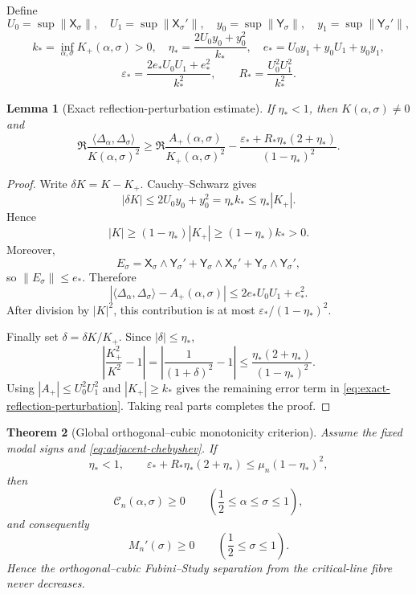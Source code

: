\documentclass[11pt]{amsart}
\numberwithin{equation}{section}
\newtheorem{theorem}{Theorem}[section]
\newtheorem{lemma}[theorem]{Lemma}
\begin{document}
Define
\[
U_0=\sup\|\mathsf X_\sigma\|,\quad
U_1=\sup\|\mathsf X_\sigma'\|,\quad
y_0=\sup\|\mathsf Y_\sigma\|,\quad
y_1=\sup\|\mathsf Y_\sigma'\|,
\]
\[
k_*=\inf_{\alpha,\sigma}K_+(\alpha,\sigma)>0,
\quad
\eta_*=\frac{2U_0y_0+y_0^2}{k_*},
\quad
e_*=U_0y_1+y_0U_1+y_0y_1,
\]
\[
\varepsilon_*=\frac{2e_*U_0U_1+e_*^2}{k_*^2},
\qquad
R_*=\frac{U_0^2U_1^2}{k_*^2}.
\]

\begin{lemma}[Exact reflection-perturbation estimate]
\label{lem:exact-reflection-perturbation}
If $\eta_*<1$, then $K(\alpha,\sigma)\ne0$ and
\begin{equation}
\Re\frac{\langle\Delta_\alpha,\Delta_\sigma\rangle}
{K(\alpha,\sigma)^2}
\ge
\Re\frac{A_+(\alpha,\sigma)}{K_+(\alpha,\sigma)^2}
-\frac{\varepsilon_*+R_*\eta_*(2+\eta_*)}{(1-\eta_*)^2}.
\label{eq:exact-reflection-perturbation}
\end{equation}
\end{lemma}

\begin{proof}
Write $\delta K=K-K_+$.  Cauchy--Schwarz gives
\[
|\delta K|
\le2U_0y_0+y_0^2
=\eta_*k_*
\le\eta_*|K_+|.
\]
Hence
\[
|K|\ge(1-\eta_*)|K_+|
\ge(1-\eta_*)k_*>0.
\]
Moreover,
\[
E_\sigma
=\mathsf X_\sigma\wedge\mathsf Y_\sigma'
+\mathsf Y_\sigma\wedge\mathsf X_\sigma'
+\mathsf Y_\sigma\wedge\mathsf Y_\sigma',
\]
so $\|E_\sigma\|\le e_*$.  Therefore
\[
\left|
\langle\Delta_\alpha,\Delta_\sigma\rangle
-A_+(\alpha,\sigma)
\right|
\le2e_*U_0U_1+e_*^2.
\]
After division by $|K|^2$, this contribution is at most
$\varepsilon_* /(1-\eta_*)^2$.

Finally set $\delta=\delta K/K_+$.  Since $|\delta|\le\eta_*$,
\[
\left|\frac{K_+^2}{K^2}-1\right|
=\left|\frac1{(1+\delta)^2}-1\right|
\le\frac{\eta_*(2+\eta_*)}{(1-\eta_*)^2}.
\]
Using $|A_+|\le U_0^2U_1^2$ and $|K_+|\ge k_*$ gives the remaining
error term in \eqref{eq:exact-reflection-perturbation}.  Taking real
parts completes the proof.
\end{proof}

\begin{theorem}[Global orthogonal--cubic monotonicity criterion]
\label{thm:oc-global-criterion}
Assume the fixed modal signs and \eqref{eq:adjacent-chebyshev}. If
\begin{equation}
\boxed{
\eta_*<1,
\qquad
\varepsilon_*+R_*\eta_*(2+\eta_*)
\le\mu_n(1-\eta_*)^2,
}
\label{eq:perturbative-global-criterion}
\end{equation}
then
\begin{equation}
\boxed{
\mathcal C_n(\alpha,\sigma)\ge0
\qquad\left(\frac12\le\alpha\le\sigma\le1\right),
}
\label{eq:C-global-from-criterion}
\end{equation}
and consequently
\begin{equation}
\boxed{
M_n'(\sigma)\ge0
\qquad\left(\frac12\le\sigma\le1\right).
}
\label{eq:M-global-from-criterion}
\end{equation}
Hence the orthogonal--cubic Fubini--Study separation from the critical-line fibre never decreases.
\end{theorem}
\end{document}
